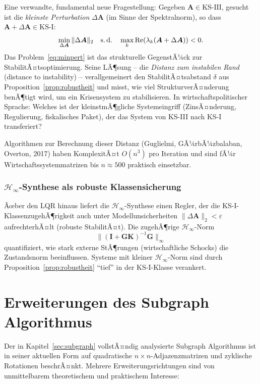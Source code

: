 ﻿\documentclass[12pt, a4paper, titlepage]{report}
\theoremstyle{definition}
\theoremstyle{remark}
\newcommand{\vA}{\bm{A}}
\newcommand{\vI}{\bm{I}}
\newcommand{\vK}{\bm{K}}
\newcommand{\vG}{\bm{G}}
\newcommand{\re}{\mathrm{Re}}
\newcommand{\KS}{\mathrm{KS}}
\begin{document}
Eine verwandte, fundamental neue Fragestellung: Gegeben $\vA \in \KS\text{-III}$,
gesucht ist die \emph{kleinste Perturbation} $\Delta\vA$ (im Sinne der Spektralnorm),
so dass $\vA + \Delta\vA \in \KS\text{-I}$:
\begin{equation}
  \min_{\Delta\vA} \|\Delta\vA\|_2 \quad \text{s.\,d.} \quad
  \max_k \re(\lambda_k(\vA + \Delta\vA)) < 0.
  \label{eq:minpert}
\end{equation}
Das Problem~\eqref{eq:minpert} ist das strukturelle GegenstÃ¼ck zur
StabilitÃ¤tsoptimierung. Seine LÃ¶sung -- die \emph{Distanz zum instabilen Rand} (distance
to instability) -- verallgemeinert den StabilitÃ¤tsabstand $\delta$ aus
Proposition~\ref{prop:robustheit} und misst, wie viel StrukturverÃ¤nderung benÃ¶tigt wird,
um ein Krisensystem zu stabilisieren. In wirtschaftspolitischer Sprache: Welches ist
der kleinstmÃ¶gli\-che System\-eingriff (ZinsÃ¤nderung, Regulierung, fiskalisches Paket),
der das System von KS-III nach KS-I transferiert?

Algorithmen zur Berechnung dieser Distanz (Guglielmi, GÃ¼rbÃ¼zbalaban, Overton, 2017)
haben KomplexitÃ¤t $O(n^3)$ pro Iteration und sind fÃ¼r Wirtschaftssystemmatrizen
bis $n \approx 500$ praktisch einsetzbar.

\subsubsection*{$\mathcal{H}_\infty$-Synthese als robuste Klassensicherung}

Ãœber den LQR hinaus liefert die $\mathcal{H}_\infty$-Synthese einen Regler, der
die KS-I-KlassenzugehÃ¶rig\-keit auch unter Modellunsicherheiten $\|\Delta\vA\|_2 < \varepsilon$
aufrecht\-erhÃ¤lt (robuste StabilitÃ¤t). Die zugehÃ¶rige $\mathcal{H}_\infty$-Norm
\[
  \|(\vI + \vG\vK)^{-1}\vG\|_\infty
\]
quantifiziert, wie stark externe StÃ¶rungen
(wirtschaftliche Schocks) die Zustandsnorm beeinflussen. Systeme mit kleiner
$\mathcal{H}_\infty$-Norm sind durch Proposition~\ref{prop:robustheit} ``tief''
in der KS-I-Klasse verankert.

\section{Erweiterungen des Subgraph Algorithmus}
\label{subsec:subgraph_erw}

Der in Kapitel~\ref{sec:subgraph} vollstÃ¤ndig analysierte Subgraph Algorithmus
\citep{epp2026subgraph} ist in seiner aktuellen Form auf quadratische
$n \times n$-Adjazenzmatrizen und zyklische Rotationen beschrÃ¤nkt. Mehrere
Erweiterungsrichtungen sind von unmittelbarem theoretischem und praktischem Interesse:
\end{document}

